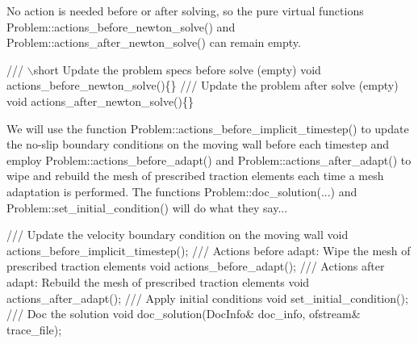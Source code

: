 No action is needed before or after solving, so the pure virtual functions {\ttfamily Problem\+::actions\+\_\+before\+\_\+newton\+\_\+solve()} and {\ttfamily Problem\+::actions\+\_\+after\+\_\+newton\+\_\+solve()} can remain empty.


\begin{DoxyCodeInclude}
 \textcolor{comment}{}
\textcolor{comment}{ /// \(\backslash\)short Update the problem specs before solve (empty) }
\textcolor{comment}{} \textcolor{keywordtype}{void} actions\_before\_newton\_solve()\{\}
\textcolor{comment}{}
\textcolor{comment}{ /// Update the problem after solve (empty)}
\textcolor{comment}{} \textcolor{keywordtype}{void} actions\_after\_newton\_solve()\{\}

\end{DoxyCodeInclude}


We will use the function {\ttfamily Problem\+::actions\+\_\+before\+\_\+implicit\+\_\+timestep()} to update the no-\/slip boundary conditions on the moving wall before each timestep and employ {\ttfamily Problem\+::actions\+\_\+before\+\_\+adapt()} and {\ttfamily Problem\+::actions\+\_\+after\+\_\+adapt()} to wipe and rebuild the mesh of prescribed traction elements each time a mesh adaptation is performed. The functions {\ttfamily Problem\+::doc\+\_\+solution}(...) and {\ttfamily Problem\+::set\+\_\+initial\+\_\+condition()} will do what they say...


\begin{DoxyCodeInclude}
 \textcolor{comment}{}
\textcolor{comment}{ /// Update the velocity boundary condition on the moving wall}
\textcolor{comment}{} \textcolor{keywordtype}{void} actions\_before\_implicit\_timestep();
\textcolor{comment}{}
\textcolor{comment}{ /// Actions before adapt: Wipe the mesh of prescribed traction elements}
\textcolor{comment}{} \textcolor{keywordtype}{void} actions\_before\_adapt();
 \textcolor{comment}{}
\textcolor{comment}{ /// Actions after adapt: Rebuild the mesh of prescribed traction elements}
\textcolor{comment}{} \textcolor{keywordtype}{void} actions\_after\_adapt();
\textcolor{comment}{}
\textcolor{comment}{ /// Apply initial conditions}
\textcolor{comment}{} \textcolor{keywordtype}{void} set\_initial\_condition();
\textcolor{comment}{}
\textcolor{comment}{ /// Doc the solution}
\textcolor{comment}{} \textcolor{keywordtype}{void} doc\_solution(DocInfo& doc\_info, ofstream& trace\_file);

\end{DoxyCodeInclude}


